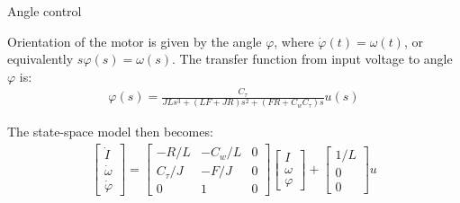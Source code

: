 \documentclass{beamer}
\begin{document}
\begin{frame}{Angle control}
	\begin{flushleft}
		
		Orientation of the motor is given by the angle $\varphi$, where $\dot \varphi(t) = \omega(t)$, or equivalently $s \varphi(s) = \omega(s)$. The transfer function from input voltage to angle $\varphi$ is:
		\begin{align}
			\varphi(s)  = \frac{C_\tau}{JL s^3 + (LF+JR)s^2 + (FR+C_w C_\tau)s} u(s)
		\end{align}
		
		The state-space model then becomes:
		\begin{align}
			\begin{bmatrix}
				\dot I \\ \dot\omega \\ \dot \varphi
			\end{bmatrix}
			=
			\begin{bmatrix}
				-R/L & -C_w/L & 0 \\
				C_\tau/J & -F/J & 0 \\
				0 & 1 & 0
			\end{bmatrix}
			\begin{bmatrix}
				I \\ \omega \\ \varphi
			\end{bmatrix}
			+
			\begin{bmatrix}
				1/L \\ 0 \\ 0
			\end{bmatrix}
			u
		\end{align}
		
		
		
	\end{flushleft}
\end{frame}
\end{document}

